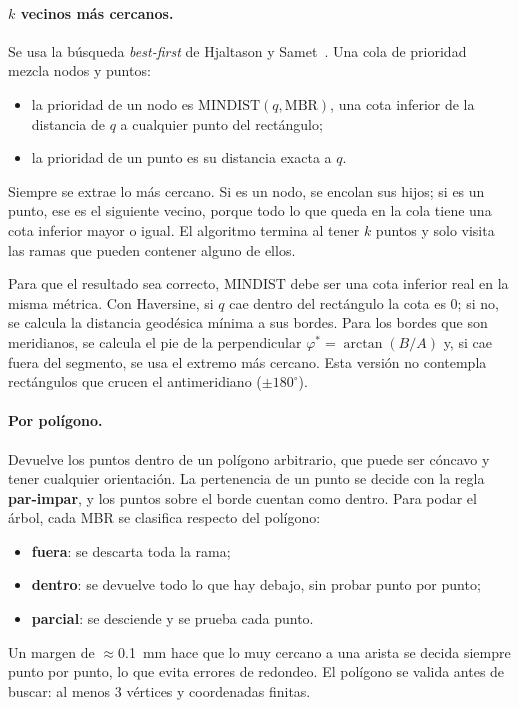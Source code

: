\documentclass[11pt,a4paper]{article}
\begin{document}
\paragraph{$k$ vecinos más cercanos.} Se usa la búsqueda \emph{best-first} de Hjaltason y Samet~\cite{hjaltason1999}. Una cola de prioridad mezcla nodos y puntos:
\begin{itemize}
  \item la prioridad de un nodo es $\text{MINDIST}(q, \text{MBR})$, una cota inferior de la distancia de $q$ a cualquier punto del rectángulo;
  \item la prioridad de un punto es su distancia exacta a $q$.
\end{itemize}
Siempre se extrae lo más cercano. Si es un nodo, se encolan sus hijos; si es un punto, ese es el siguiente vecino, porque todo lo que queda en la cola tiene una cota inferior mayor o igual. El algoritmo termina al tener $k$ puntos y solo visita las ramas que pueden contener alguno de ellos.

Para que el resultado sea correcto, MINDIST debe ser una cota inferior real en la misma métrica. Con Haversine, si $q$ cae dentro del rectángulo la cota es 0; si no, se calcula la distancia geodésica mínima a sus bordes. Para los bordes que son meridianos, se calcula el pie de la perpendicular $\varphi^* = \arctan(B/A)$ y, si cae fuera del segmento, se usa el extremo más cercano. Esta versión no contempla rectángulos que crucen el antimeridiano ($\pm180^\circ$).

\paragraph{Por polígono.} Devuelve los puntos dentro de un polígono arbitrario, que puede ser cóncavo y tener cualquier orientación. La pertenencia de un punto se decide con la regla \textbf{par-impar}, y los puntos sobre el borde cuentan como dentro. Para podar el árbol, cada MBR se clasifica respecto del polígono:
\begin{itemize}
  \item \textbf{fuera}: se descarta toda la rama;
  \item \textbf{dentro}: se devuelve todo lo que hay debajo, sin probar punto por punto;
  \item \textbf{parcial}: se desciende y se prueba cada punto.
\end{itemize}
Un margen de $\approx$0.1~mm hace que lo muy cercano a una arista se decida siempre punto por punto, lo que evita errores de redondeo. El polígono se valida antes de buscar: al menos 3 vértices y coordenadas finitas.
\end{document}
